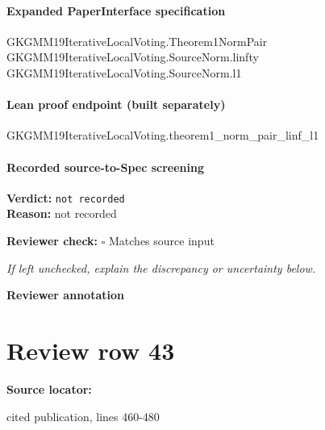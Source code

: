 \documentclass[10pt]{article}
\newcommand{\reviewerbox}{%
  \par\noindent\fbox{\parbox{0.96\linewidth}{\rule{0pt}{0.38in}}}\par
}
\newcommand{\reviewmatch}[1]{%
  \par\noindent\textbf{Reviewer check:} $\square$\; #1\par
  \noindent\emph{If left unchecked, explain the discrepancy or uncertainty below.}\par
}
\begin{document}
\paragraph{Expanded PaperInterface specification}
\begin{ReviewVerbatim}
GKGMM19IterativeLocalVoting.Theorem1NormPair GKGMM19IterativeLocalVoting.SourceNorm.linfty
  GKGMM19IterativeLocalVoting.SourceNorm.l1
\end{ReviewVerbatim}

\paragraph{Lean proof endpoint (built separately)}\begin{ReviewVerbatim}
GKGMM19IterativeLocalVoting.theorem1_norm_pair_linf_l1
\end{ReviewVerbatim}

\paragraph{Recorded source-to-Spec screening}
\textbf{Verdict:} \texttt{not recorded}
\\
\textbf{Reason:} not recorded
\reviewmatch{Matches source input}
\noindent\textbf{Reviewer annotation}\par
\reviewerbox
\clearpage
\hypertarget{source-claim-8fdb269066d0c098}{}
\section*{Review row 43}
\textbf{Source locator:} {\footnotesize\raggedright cited publication, lines 460-\allowbreak{}480\par}
\end{document}
